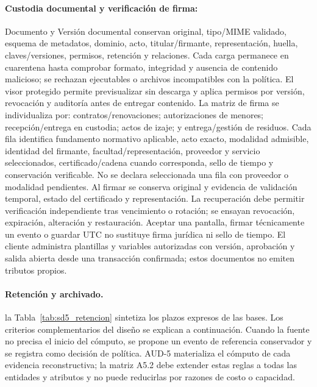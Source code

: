 \paragraph{Custodia documental y verificación de firma:}
Documento y Versión documental conservan original, tipo/MIME validado, esquema de metadatos, dominio, acto, titular/firmante, representación, huella, claves/versiones, permisos, retención y relaciones. Cada carga permanece en cuarentena hasta comprobar formato, integridad y ausencia de contenido malicioso; se rechazan ejecutables o archivos incompatibles con la política. El visor protegido permite previsualizar sin descarga y aplica permisos por versión, revocación y auditoría antes de entregar contenido.
La matriz de firma se individualiza por: contratos/renovaciones; autorizaciones de menores; recepción/entrega en custodia; actos de izaje; y entrega/gestión de residuos. Cada fila identifica fundamento normativo aplicable, acto exacto, modalidad admisible, identidad del firmante, facultad/representación, proveedor y servicio seleccionados, certificado/cadena cuando corresponda, sello de tiempo y conservación verificable. No se declara seleccionada una fila con proveedor o modalidad pendientes.
Al firmar se conserva original y evidencia de validación temporal, estado del certificado y representación. La recuperación debe permitir verificación independiente tras vencimiento o rotación; se ensayan revocación, expiración, alteración y restauración. Aceptar una pantalla, firmar técnicamente un evento o guardar UTC no sustituye firma jurídica ni sello de tiempo. El cliente administra plantillas y variables autorizadas con versión, aprobación y salida abierta desde una transacción confirmada; estos documentos no emiten tributos propios.

\paragraph{Retención y archivado.}

la Tabla~\ref{tab:sd5_retencion} sintetiza los plazos expresos de las bases. Los criterios complementarios del diseño se explican a continuación. Cuando la fuente no precisa el inicio del cómputo, se propone un evento de referencia conservador y se registra como decisión de política. AUD-5 materializa el cómputo de cada evidencia reconstructiva; la matriz A5.2 debe extender estas reglas a todas las entidades y atributos y no puede reducirlas por razones de costo o capacidad.

